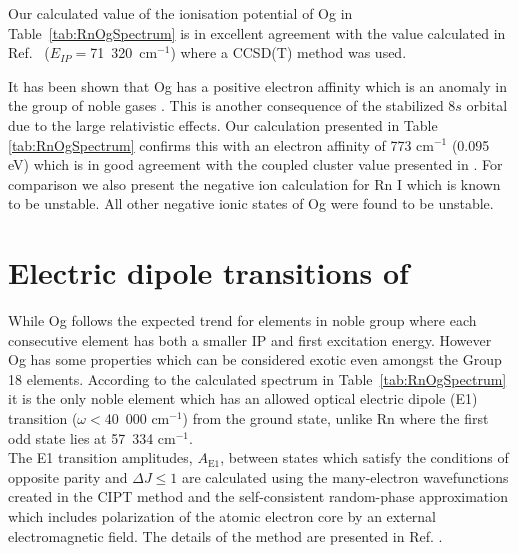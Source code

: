 \documentclass[8pt,a4paper, twoside]{report}
\begin{document}
Our calculated value of the ionisation potential of Og in Table~\ref{tab:RnOgSpectrum} is in excellent agreement with the value calculated in Ref.~\cite{Jerabek2018} ($E_{IP}=$71~320~cm$^{-1}$) where a CCSD(T) method was used.  

It has been shown that Og has a positive electron affinity which is an anomaly in the group of noble gases \cite{EliavOg1996, Goidenko2003, Eliav2015}. This is another consequence of the stabilized $8s$ orbital due to the large relativistic effects. Our calculation presented in Table \ref{tab:RnOgSpectrum}  confirms this with an electron affinity of 773 cm$^{-1}$ (0.095 eV) which is in good agreement with the coupled cluster value presented in \cite{Goidenko2003}. For comparison we also present the negative ion calculation for Rn I which is known to be unstable. All other negative ionic states of Og were found to be unstable.

\section{Electric dipole transitions of} \label{sec:E1}
 While Og  follows the expected trend for elements in noble group where each consecutive element has both a smaller IP and first excitation energy. However Og has some properties which can be considered exotic even amongst the Group 18 elements. According to the calculated spectrum in Table~\ref{tab:RnOgSpectrum} it is the only noble element which has an allowed optical electric dipole (E1) transition ($\omega < $40~000 cm$^{-1}$) from the ground state, unlike Rn where the first odd state lies at 57~334 cm$^{-1}$. \\
 
 The E1 transition amplitudes, $A_{\text{E1}}$, between states which satisfy the conditions of opposite parity and $\Delta J \leq 1$   are calculated using the many-electron wavefunctions created in the CIPT method and the self-consistent random-phase approximation which 
includes polarization of  the atomic electron core by an external electromagnetic field. The details  of the method are presented  in Ref. \cite{Dzuba2018}. \\
 
\end{document}
